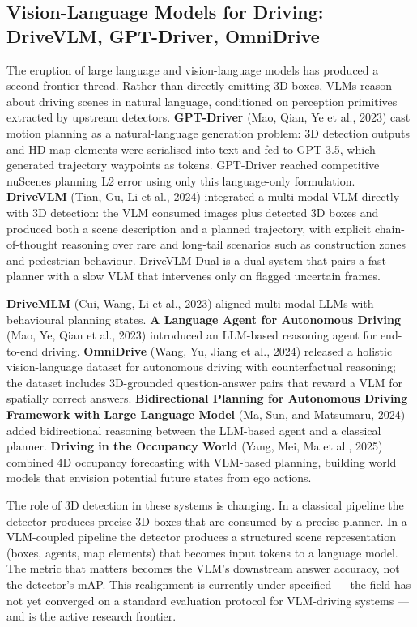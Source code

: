\subsection{Vision-Language Models for Driving: DriveVLM, GPT-Driver, OmniDrive}\label{vision-language-models-for-driving-drivevlm-gpt-driver-omnidrive}

The eruption of large language and vision-language models has produced a second frontier thread. Rather than directly emitting 3D boxes, VLMs reason about driving scenes in natural language, conditioned on perception primitives extracted by upstream detectors. \textbf{GPT-Driver} (Mao, Qian, Ye et al., 2023) cast motion planning as a natural-language generation problem: 3D detection outputs and HD-map elements were serialised into text and fed to GPT-3.5, which generated trajectory waypoints as tokens. GPT-Driver reached competitive nuScenes planning L2 error using only this language-only formulation. \textbf{DriveVLM} (Tian, Gu, Li et al., 2024) integrated a multi-modal VLM directly with 3D detection: the VLM consumed images plus detected 3D boxes and produced both a scene description and a planned trajectory, with explicit chain-of-thought reasoning over rare and long-tail scenarios such as construction zones and pedestrian behaviour. DriveVLM-Dual is a dual-system that pairs a fast planner with a slow VLM that intervenes only on flagged uncertain frames.

\textbf{DriveMLM} (Cui, Wang, Li et al., 2023) aligned multi-modal LLMs with behavioural planning states. \textbf{A Language Agent for Autonomous Driving} (Mao, Ye, Qian et al., 2023) introduced an LLM-based reasoning agent for end-to-end driving. \textbf{OmniDrive} (Wang, Yu, Jiang et al., 2024) released a holistic vision-language dataset for autonomous driving with counterfactual reasoning; the dataset includes 3D-grounded question-answer pairs that reward a VLM for spatially correct answers. \textbf{Bidirectional Planning for Autonomous Driving Framework with Large Language Model} (Ma, Sun, and Matsumaru, 2024) added bidirectional reasoning between the LLM-based agent and a classical planner. \textbf{Driving in the Occupancy World} (Yang, Mei, Ma et al., 2025) combined 4D occupancy forecasting with VLM-based planning, building world models that envision potential future states from ego actions.

The role of 3D detection in these systems is changing. In a classical pipeline the detector produces precise 3D boxes that are consumed by a precise planner. In a VLM-coupled pipeline the detector produces a structured scene representation (boxes, agents, map elements) that becomes input tokens to a language model. The metric that matters becomes the VLM's downstream answer accuracy, not the detector's mAP. This realignment is currently under-specified --- the field has not yet converged on a standard evaluation protocol for VLM-driving systems --- and is the active research frontier.

